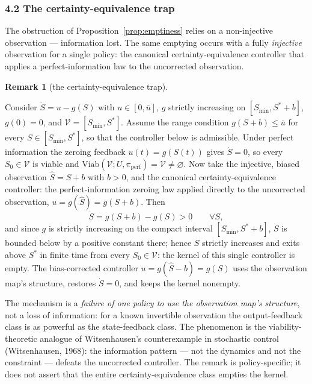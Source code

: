 \documentclass[10pt,twocolumn]{article}
\theoremstyle{definition}
\newtheorem{remark}{Remark}
\begin{document}
\subsubsection{4.2 The certainty-equivalence
trap}\label{the-certainty-equivalence-trap}

The obstruction of Proposition~\ref{prop:emptiness} relies on a non-injective observation ---
information lost. The same emptying occurs with a fully
\emph{injective} observation for a single policy: the canonical
certainty-equivalence controller that applies a perfect-information law
to the uncorrected observation.

\begin{remark}[the certainty-equivalence trap]\label{rem:ce-trap}

Consider \(\dot S = u - g(S)\) with \(u \in [0, \bar u]\), \(g\) strictly
increasing on \([S_{\min}, S^* + b]\), \(g(0) = 0\), and
\(\mathcal{V} = [S_{\min}, S^*]\). Assume the range condition
\(g(S + b) \le \bar u\) for every \(S \in [S_{\min}, S^*]\), so that the
controller below is admissible. Under perfect information the zeroing
feedback \(u(t) = g(S(t))\) gives \(\dot S = 0\), so every
\(S_0 \in \mathcal{V}\) is viable and
\(\mathrm{Viab}(\mathcal{V}; U, \pi_{\mathrm{perf}}) = \mathcal{V} \neq \varnothing\).
Now take the injective, biased observation \(\hat S = S + b\) with
\(b > 0\), and the canonical certainty-equivalence controller: the
perfect-information zeroing law applied directly to the uncorrected
observation, \(u = g(\hat S) = g(S + b)\). Then
\[\dot S = g(S + b) - g(S) > 0 \qquad \forall S,\]
and since \(g\) is strictly increasing on the compact interval
\([S_{\min}, S^* + b]\), \(\dot S\) is bounded below by a positive
constant there; hence \(S\) strictly increases and exits above \(S^*\) in
finite time from every \(S_0 \in \mathcal{V}\): the kernel of this single
controller is empty. The bias-corrected controller
\(u = g(\hat S - b) = g(S)\) uses the observation map's structure, restores
\(\dot S = 0\), and keeps the kernel nonempty.

The mechanism is a \emph{failure of one policy to use the observation
map's structure}, not a loss of information: for a known invertible
observation the output-feedback class is as powerful as the
state-feedback class. The phenomenon is the viability-theoretic analogue
of Witsenhausen's counterexample in stochastic control (Witsenhausen,
1968): the information pattern --- not the dynamics and not the
constraint --- defeats the uncorrected controller. The remark is
policy-specific; it does not assert that the entire certainty-equivalence
class empties the kernel.

\end{remark}
\end{document}
